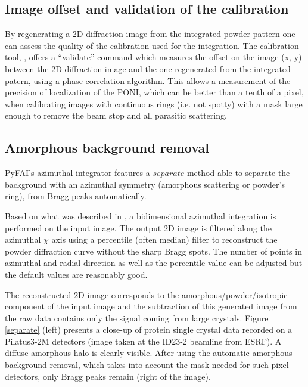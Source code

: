\documentclass[preprint]{iucr}
\begin{document}
\subsection{Image offset and validation of the calibration}
By regenerating a 2D diffraction image from the integrated powder pattern one
can assess the quality of the calibration used for the integration.
The calibration tool, , offers  a ``validate'' command which
measures the offset on the image (x, y) between the 2D diffraction image and the
one regenerated from the integrated patern, using a phase correlation
algorithm.
This allows a measurement of the precision of localization of the PONI, which
can be better than a tenth of a pixel, when calibrating images with continuous
rings (i.e. not spotty) with a mask large enough to remove the beam stop and
all parasitic scattering.

\subsection{Amorphous background removal}

PyFAI's azimuthal integrator features a $separate$ method able to separate
the background with an azimuthal symmetry (amorphous scattering or powder's
ring), from Bragg peaks automatically.

Based on what was described in \cite{PyFAI_PDJ}, a bidimensional azimuthal
integration is performed on the input image.
The output 2D image is filtered along the azimuthal $\chi$ axis using a
percentile (often median) filter to reconstruct the powder diffraction curve
without the sharp Bragg spots.
The number of points in azimuthal and radial direction as well as
the percentile value can be adjusted but the default values are reasonably
good.

The reconstructed 2D image corresponds to the amorphous/powder/isotropic
component of the input image and the subtraction of this generated image from
the raw data contains only the signal coming from large crystals.
Figure \ref{separate} (left)
presents a close-up of protein single crystal data recorded on a Pilatus3-2M
detectors (image taken at the ID23-2 beamline from ESRF). A
diffuse amorphous halo is clearly visible. 
After using the automatic amorphous background removal, which takes into account
the mask needed for such pixel detectors, only Bragg peaks remain (right of
the image).
\end{document}
